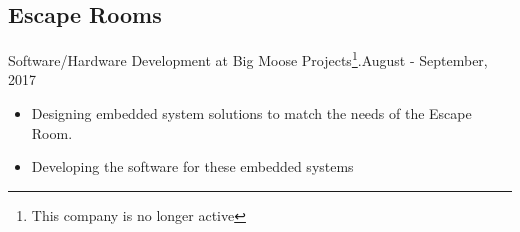   \subsection{Escape Rooms}
    Software/Hardware Development at {\textcolor{mycolor}{Big Moose Projects}}\footnote{This company is no longer active}.{\textcolor{mygrey}{\hspace*{\fill}August - September, 2017}}

    \begin{itemize}
      \item Designing embedded system solutions to match the needs of the Escape Room.
      \item Developing the software for these embedded systems
    \end{itemize}